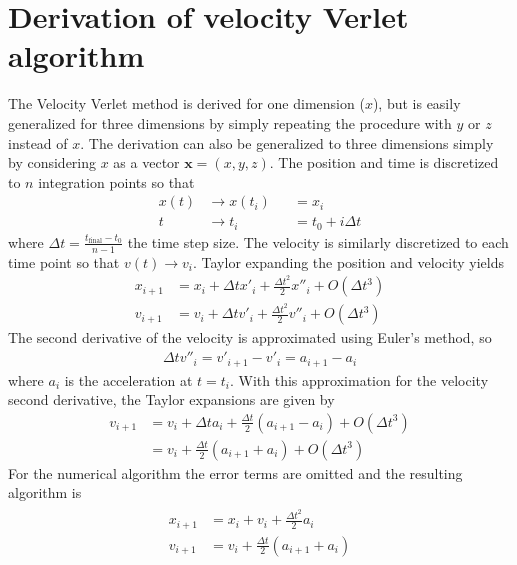 \documentclass[aps,reprint]{revtex4-1}
\newcommand\blankpage{%
  \null
  \thispagestyle{empty}%
  \addtocounter{page}{-1}%
  \newpage}
\begin{document}
\section{Derivation of velocity Verlet algorithm}
\label{sec:velocityverlet}
The Velocity Verlet method is derived for one dimension ($x$), but is easily
generalized for three dimensions by simply repeating the procedure with $y$
or $z$ instead of $x$. The derivation can also be generalized to three dimensions
simply by considering $x$ as a vector $\mathbf{x} = (x, y, z)$.
The position and time is discretized to $n$ integration points so that
\begin{align*}
  x(t) &\rightarrow x(t_i) &&= x_i \\
  t &\rightarrow t_i &&= t_0 + i\Delta{t}
\end{align*}
where $\Delta{t} = \frac{t_\text{final} - t_0}{n-1}$ the time step size. The velocity
is similarly discretized to each time point so that $v(t) \rightarrow v_i$.
Taylor expanding the position and velocity yields
\begin{align*}
  x_{i+1} &= x_i + \Delta{t} x'_i + \frac{\Delta{t}^2}{2} x''_i + O(\Delta{t}^3) \\
  v_{i+1} &= v_i + \Delta{t} v'_i + \frac{\Delta{t}^2}{2} v''_i + O(\Delta{t}^3)
\end{align*}
The second derivative of the velocity is approximated using Euler's method, so
\begin{align*}
  \Delta{t} v''_i = v'_{i+1} - v'_{i} = a_{i+1} - a_{i}
\end{align*}
where $a_i$ is the acceleration at $t = t_i$. With this approximation for the
velocity second derivative, the Taylor expansions are given by
\begin{align*}
  v_{i+1} &= v_i + \Delta{t} a_i + \frac{\Delta{t}}{2} (a_{i+1} - a_i) + O(\Delta{t}^3) \\
          &= v_i + \frac{\Delta{t}}{2} (a_{i+1} + a_{i}) + O(\Delta{t}^3)
\end{align*}
For the numerical algorithm the error terms are omitted and the resulting
algorithm is
\begin{align}
  \begin{split}
    x_{i+1} &= x_i + v_i + \frac{\Delta{t}^2}{2} a_i \\
    v_{i+1} &= v_i + \frac{\Delta{t}}{2}(a_{i+1} + a_{i})
  \end{split}
\end{align}
\blankpage
\end{document}
